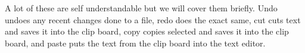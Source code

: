 \documentclass[a4paper, 11pt]{article}
\begin{document}
				\noindent A lot of these are self understandable but we will cover them briefly. Undo undoes any recent changes done to a file, redo does the exact same, cut cuts text and saves it into the clip board, copy copies selected and saves it into the clip board, and paste puts the text from the clip board into the text editor.
\end{document}
